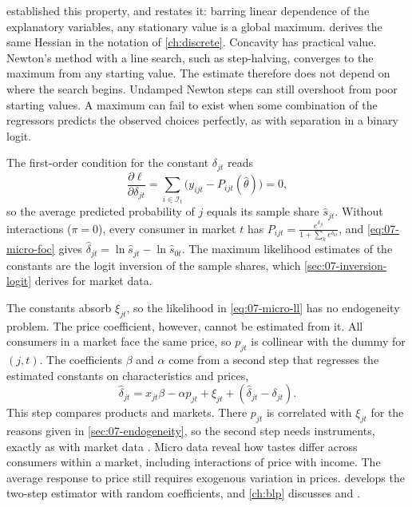 \citet{McFadden1974} established this property, and \citet[p.~1413]{McFadden1984} restates it: barring linear
dependence of the explanatory variables, any stationary value is a global maximum. 
derives the same Hessian in the notation of \cref{ch:discrete}. Concavity has practical value. Newton's method
with a line search, such as step-halving, converges to the maximum from any starting value. The estimate
therefore does not depend on where the search begins. Undamped Newton steps can still overshoot from poor
starting values. A maximum can
fail to exist when some combination of the regressors predicts the observed choices perfectly, as with
separation in a binary logit.

The first-order condition for the constant $\delta_{jt}$ reads
\begin{equation}\label{eq:07-micro-foc}
  \frac{\partial \ell}{\partial \delta_{jt}} = \sum_{i \in \mathcal{I}_t}\big(y_{ijt} - P_{ijt}(\hat\theta)\big) = 0,
\end{equation}
so the average predicted probability of $j$ equals its sample share $\hat s_{jt}$. Without interactions
($\pi = 0$), every consumer in market $t$ has $P_{ijt} = \frac{e^{\delta_{jt}}}{1 + \sum_k e^{\delta_{kt}}}$, and
\eqref{eq:07-micro-foc} gives $\hat\delta_{jt} = \ln\hat s_{jt} - \ln\hat s_{0t}$. The maximum likelihood
estimates of the constants are the logit inversion of the sample shares, which \cref{sec:07-inversion-logit}
derives for market data.

The constants absorb $\xi_{jt}$, so the likelihood in \eqref{eq:07-micro-ll} has no endogeneity problem. The
price coefficient, however, cannot be estimated from it. All consumers in a market face the same price, so
$p_{jt}$ is collinear with the dummy for $(j, t)$. The coefficients $\beta$ and $\alpha$ come from a second
step that regresses the estimated constants on characteristics and prices,
\begin{equation}\label{eq:07-micro-second}
  \hat\delta_{jt} = x_{jt}\beta - \alpha p_{jt} + \xi_{jt} + (\hat\delta_{jt} - \delta_{jt}) .
\end{equation}
This step compares products and markets. There $p_{jt}$ is correlated with $\xi_{jt}$ for the reasons given in
\cref{sec:07-endogeneity}, so the second step needs instruments, exactly as with market data
\citep[p.~259]{Berry1994}. Micro data reveal how tastes differ across consumers within a market, including
interactions of price with income. The average response to price still requires exogenous variation in
prices.  develops the two-step estimator with random coefficients, and \cref{ch:blp}
discusses \citet{Goldberg1995} and \citet*{BerryLevinsohnPakes2004}.

